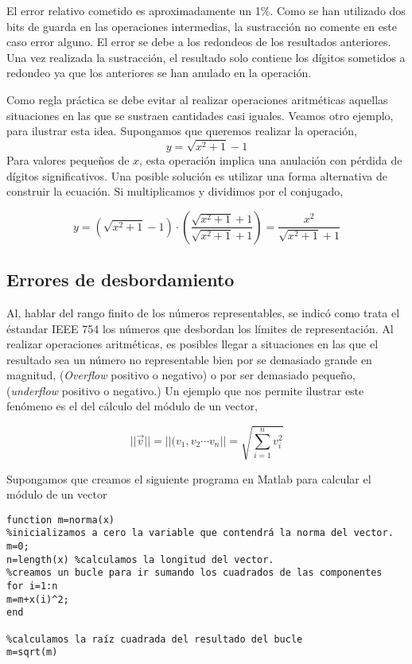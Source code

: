 El error relativo cometido es aproximadamente un 1\%. Como se han utilizado dos bits de guarda en las operaciones intermedias, la sustracción no comente en este caso error alguno. El error se debe a los redondeos de los resultados anteriores. Una vez realizada la sustracción, el resultado solo contiene los dígitos sometidos a redondeo ya que los anteriores se han anulado en la operación.

Como regla práctica se debe evitar al realizar operaciones aritméticas aquellas situaciones en las que se sustraen cantidades casi iguales. Veamos otro ejemplo, para ilustrar esta idea. Supongamos que queremos realizar la operación,
\begin{equation*}
y=\sqrt{x^2+1}-1
\end{equation*}
Para valores pequeños de $x$, esta operación implica una anulación con pérdida de dígitos significativos. Una posible solución es utilizar una forma alternativa de construir la ecuación. Si multiplicamos y dividimos por el conjugado,

\begin{equation*}
y=(\sqrt{x^2+1}-1)\cdot\left(\frac{\sqrt{x^2+1}+1}{\sqrt{x^2+1}+1}\right)=\frac{x^2}{\sqrt{x^2+1}+1}
\end{equation*}

\subsection{Errores de desbordamiento}

Al, hablar del rango finito de los números representables, se indicó como trata el éstandar IEEE 754 los números que desbordan los límites de representación. Al realizar operaciones aritméticas, es posibles llegar a situaciones en las que el resultado sea un número no representable bien por se demasiado grande en magnitud, (\emph{Overflow} positivo o negativo) o por ser demasiado pequeño, (\emph{underflow} positivo o negativo.) Un ejemplo que nos permite ilustrar este fenómeno es el del cálculo del módulo de un vector,

\begin{equation*}
\vert\vert\vec{v}\vert\vert=\vert\vert(v_1, v_2\cdots v_n\vert\vert=\sqrt{\sum_{i=1}^nv_i^2}
\end{equation*}

Supongamos que creamos el siguiente programa en Matlab para calcular el módulo de un vector

\begin{verbatim}
function m=norma(x)
%inicializamos a cero la variable que contendrá la norma del vector.
m=0;
n=length(x) %calculamos la longitud del vector.
%creamos un bucle para ir sumando los cuadrados de las componentes
for i=1:n
m=m+x(i)^2;
end

%calculamos la raíz cuadrada del resultado del bucle
m=sqrt(m)
\end{verbatim}


